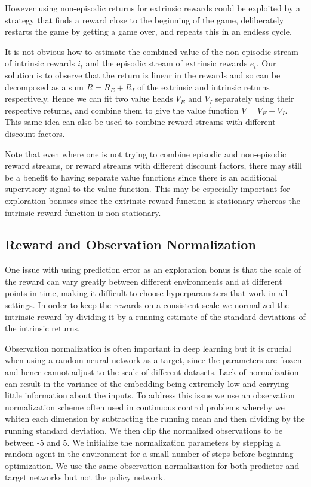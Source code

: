 \documentclass{article} %
\begin{document}
However using non-episodic returns for extrinsic rewards could be exploited by a strategy that finds a reward close to the beginning of the game, deliberately restarts the game by getting a game over, and repeats this in an endless cycle.

It is not obvious how to estimate the combined value of the non-episodic stream of intrinsic rewards $i_t$ and the episodic stream of extrinsic rewards $e_t$. Our solution is to observe that the return is linear in the rewards and so can be decomposed as a sum $R = R_E + R_I$ of the extrinsic and intrinsic returns respectively. Hence we can fit two value heads $V_E$ and $V_I$ separately using their respective returns, and combine them to give the value function $V = V_E + V_I$. This same idea can also be used to combine reward streams with different discount factors.%

Note that even where one is not trying to combine episodic and non-episodic reward streams, or reward streams with different discount factors, there may still be a benefit to having separate value functions since there is an additional supervisory signal to the value function. This may be especially important for exploration bonuses since the extrinsic reward function is stationary whereas the intrinsic reward function is non-stationary.

\subsection{Reward and Observation Normalization}
One issue with using prediction error as an exploration bonus is that the scale of the reward can vary greatly between different environments and at different points in time, making it difficult to choose hyperparameters that work in all settings. In order to keep the rewards on a consistent scale we normalized the intrinsic reward by dividing it by a running estimate of the standard deviations of the intrinsic returns.

Observation normalization is often important in deep learning but it is  crucial when using a random neural network as a target, since the parameters are frozen and hence cannot adjust to the scale of different datasets. Lack of normalization can result in the variance of the embedding being extremely low and carrying little information about the inputs. To address this issue we use an observation normalization scheme often used in continuous control problems whereby we whiten each dimension by subtracting the running mean and then dividing by the running standard deviation. We then clip the normalized observations to be between -5 and 5. We initialize the normalization parameters by stepping a random agent in the environment for a small number of steps before beginning optimization. We use the same observation normalization for both predictor and target networks but not the policy network.
\end{document}
